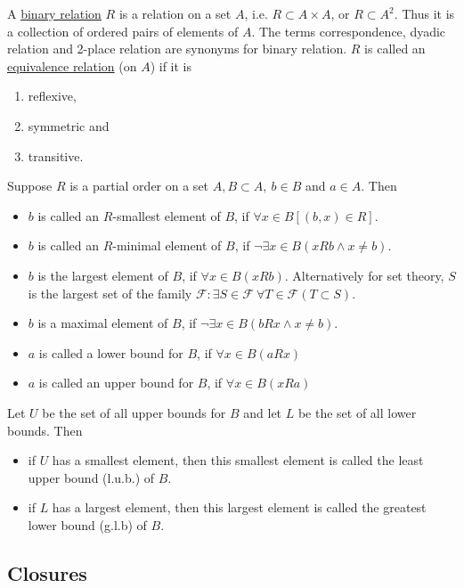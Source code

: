 \documentclass[12pt]{article}
\begin{document}
\begin{flushleft}
\begin{enumerate}
	\end{enumerate}
	\textbullet \quad A \uline{binary relation} $R$ is a relation on a set $A$, i.e. $R\subset A \times A$, or $R \subset A^2$. Thus it is a collection of ordered pairs of elements of $A$. The terms correspondence, dyadic relation and 2-place relation are synonyms for binary relation. \linebreak 
	\textbullet \quad $R$ is called an \uline{equivalence relation} (on $A$) if it is  
	\begin{enumerate}
	\item reflexive, 
	\item symmetric and 
	\item transitive.  
	\end{enumerate}
	\textbullet \quad Suppose $R$ is a partial order on a set $A,B \subset A, \ b\in B$ and $a\in A$. Then  
	\begin{itemize} %
		\renewcommand{\labelitemi}{$\rightarrow$}
	\item $b$ is called an $R$-smallest element of $B$, if $\forall x \in B \left[ (b,x) \in R \right]$. 
	\item $b$ is called an $R$-minimal element of $B$, if $\lnot \exists x\in B (xRb \land x \neq b) $. 
	\item $b$ is the largest element of $B$, if $\forall x \in B (xRb)$. Alternatively for set theory, $S$ is the largest set of the family $ \mathcal{F}: \exists S \in \mathcal{F} \ \forall T\in \mathcal{F} (T \subset S) $. 
	\item $b$ is a maximal element of $B$, if $\lnot \exists x \in B (bRx \land x\neq b)$. 
	\item $a$ is called a lower bound for $B$, if $\forall x \in B (aRx)$
	\item $a$ is called an upper bound for $B$, if $\forall x \in B (xRa)$ 
 	\end{itemize}
 	\textbullet \quad  Let $U$ be the set of all upper bounds for $B$ and let $L$ be the set of all lower bounds. Then  
 	\begin{itemize}
	 	\renewcommand{\labelitemi}{$\rightarrow$}
	 \item if $U$ has a smallest element, then this smallest element is called the least upper bound (l.u.b.) of $B$. 
	 \item if $L$ has a largest element, then this largest element is called the greatest lower bound (g.l.b) of $B$.
 	\end{itemize}
 	
 	\subsection{Closures}
 	

\end{flushleft}
\end{document}
